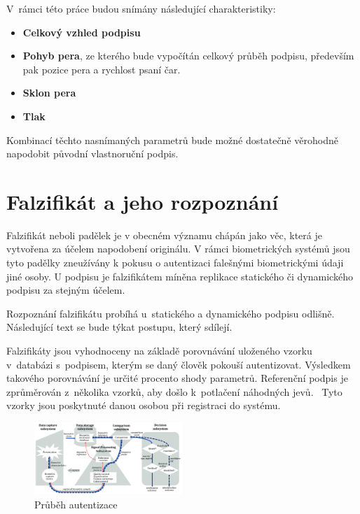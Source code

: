 \noindent
V~rámci této práce budou snímány následující charakteristiky:
\begin{itemize}
  \item \textbf{Celkový vzhled podpisu}
  \item \textbf{Pohyb pera}, ze kterého bude vypočítán celkový průběh podpisu, především pak pozice pera a rychlost psaní čar. 
  \item \textbf{Sklon pera} 
  \item \textbf{Tlak}
\end{itemize}
Kombinací těchto nasnímaných parametrů bude možné dostatečně věrohodně napodobit původní vlastnoruční podpis. 

\section{Falzifikát a jeho rozpoznání}
Falzifikát neboli padělek je v obecném významu chápán jako věc, která je vytvořena za účelem napodobení originálu.          %
V rámci biometrických systémů jsou tyto padělky zneužívány k pokusu o autentizaci falešnými biometrickými údaji jiné osoby. %
U podpisu je falzifikátem míněna replikace statického či dynamického podpisu za stejným účelem.                             %

Rozpoznání falzifikátu probíhá u~statického a dynamického podpisu odlišně. 
Následující text se bude týkat postupu, který sdílejí.

Falzifikáty jsou vyhodnoceny na základě porovnávání uloženého vzorku v~databázi s~podpisem, kterým se daný člověk pokouší autentizovat.
Výsledkem takového porovnávání je určité procento shody parametrů.
Referenční podpis je zprůměrován z~několika vzorků, aby došlo k~potlačení náhodných jevů.~\cite{VUT2009} %
Tyto vzorky jsou poskytnuté danou osobou při registraci do systému.

\begin{figure}[h]
  \centering
  \includegraphics[width=0.5\textwidth]{obrazky-figures/proces_autentizace.png}
  \caption{Průběh autentizace~\cite{ISOIEC19795-1_2021}}
  \label{fig:proces_autentizace} %
\end{figure}

